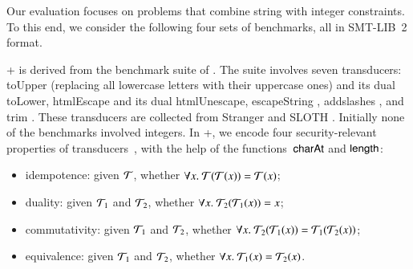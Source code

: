 %
%
% 

Our evaluation focuses on problems that combine string with integer constraints.  To this end, we consider the following four sets of
benchmarks, all in SMT-LIB~2 format.

\smallskip
\noindent \transducerbench+
is derived from the {\transducerbench} benchmark suite of {\ostrich}
\cite{CHL+19}.  The {\transducerbench} suite involves seven
transducers: toUpper (replacing all lowercase letters with their
uppercase ones) and its dual toLower, htmlEscape \cite{htmlEscape} and
its dual htmlUnescape, escapeString \cite{escapeString}, addslashes
\cite{addslashes}, and trim \cite{trim}. These transducers are
collected from Stranger \cite{YABI14} and SLOTH
\cite{HJLRV18}. Initially none of the benchmarks involved integers. In
{\transducerbench+}, we encode four security-relevant properties of
transducers~\cite{BEK}, with the help of the functions~$\mathsf{charAt}$ and
$\mathsf{length}$:
\begin{itemize}
\item idempotence: given $\mathcal{T}$, whether
  $\forall x.\ \mathcal{T}(\mathcal{T}(x)) = \mathcal{T}(x)$;
\item duality: given $\mathcal{T}_1$ and
  $\mathcal{T}_2$, whether $\forall x.\ \mathcal{T}_2(\mathcal{T}_1(x)) = x$;
\item commutativity: given $\mathcal{T}_1$ and $\mathcal{T}_2$, whether
  $\forall x.\ \mathcal{T}_2(\mathcal{T}_1(x)) = \mathcal{T}_1(\mathcal{T}_2(x))$;
\item equivalence: given $\mathcal{T}_1$ and $\mathcal{T}_2$, whether
  $\forall x.\ \mathcal{T}_1(x) = \mathcal{T}_2(x)$.
\end{itemize}

